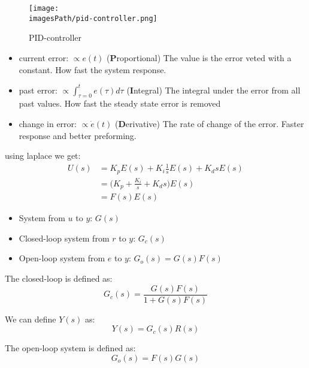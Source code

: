 \documentclass{article}
\newcommand{\imagesPath}{images}
\begin{document}
\begin{figure}[!h]
    \centering
    \texttt{[image: \\imagesPath/pid-controller.png]}
    \caption{PID-controller}
    \label{fig:pid-controller}
\end{figure}

\begin{itemize}
    \item current error: $\propto e(t)$ (\textbf{P}roportional) \newline 
    The value is the error veted with a constant. How fast the system response.
    \item past error: $\propto \int_{\tau=0}^t e(\tau)d\tau$ (\textbf{I}ntegral) \newline
    The integral under the error from all past values. How fast the steady state error is removed
    \item change in error: $\propto \dot{e}(t)$ (\textbf{D}erivative) \newline
    The rate of change of the error. Faster response and better preforming.
\end{itemize}

using laplace we get:
\begin{align*}
    U(s) &= K_p E(s) + K_i\frac{1}{s}E(s) + K_d s E(s) \\
    &= \Big(K_p + \frac{K_i}{s} + K_d s \Big) E(s) \\
    &= F(s)E(s)
\end{align*}

\begin{itemize}
    \item System from $u$ to $y$: $G(s)$
    \item Closed-loop system from $r$ to $y$: $G_c(s)$
    \item Open-loop system from $e$ to $y$: $G_o(s) = G(s)F(s)$
\end{itemize}

The closed-loop is defined as:
\begin{equation*}
    G_c(s) = \frac{G(s)F(s)}{1+G(s)F(s)}
\end{equation*}

We can define $Y(s)$ as:
\begin{equation*}
    Y(s) = G_c(s) R(s)    
\end{equation*}

The open-loop system is defined as:
\begin{equation*}
    G_o(s) = F(s)G(s)
\end{equation*}
\end{document}
